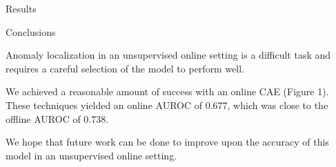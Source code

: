 \documentclass[final,hyperref={pdfpagelabels=false}]{beamer}
\begin{document}
\begin{frame}[t]
\begin{columns}[t]
\begin{column}{.465\textwidth}
\begin{block}{Results}


\end{block}
\begin{block}{Conclusions}

\begin{itemize}
\small{
\item Anomaly localization in an unsupervised online setting is a difficult task and requires a careful selection of the model to perform well.
\item We achieved a reasonable amount of success with an online CAE (Figure 1). These techniques yielded an online AUROC of 0.677, which was close to the offline AUROC of 0.738.
\item We hope that future work can be done to improve upon the accuracy of this model in an unsupervised online setting.\\[2mm]
}
\end{itemize}
\end{block}
\end{column} %

\begin{column}{.015\textwidth}\end{column} %

\end{columns} %


\end{frame}
\end{document}
